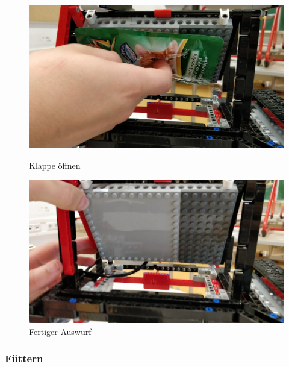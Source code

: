 \begin{figure}[H]
   \begin{minipage}[hbt]{0.5\textwidth} %
      \includegraphics[width=1\textwidth]{Bilder/Ablauf_1_png/Auswurf_4}
      \caption{Klappe öffnen}
      \label{Klappe öffnen}
   \end{minipage}
   \hspace{.04\linewidth}%
   \begin{minipage}[hbt]{0.5\textwidth} %
      \includegraphics[width=1\textwidth]{Bilder/Ablauf_1_png/Auswurf_5}
      \caption{Fertiger Auswurf}
	  \label{Fertiger Auswurf}      
      \end{minipage}
\end{figure}


\subsubsection{Füttern}

